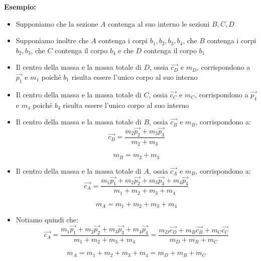 \documentclass[12pt]{report}
\renewcommand\vec{\overrightarrow}
\begin{document}
    \textbf{Esempio:}
    \begin{itemize}
        \item Supponiamo che la sezione $A$ contenga al suo interno le sezioni $B, C, D$
        \item Supponiamo inoltre che $A$ contenga i corpi $b_1, b_2, b_3, b_4$, che $B$ contenga i corpi $b_2, b_3$, che $C$ contenga il corpo $b_4$ e che $D$ contenga il corpo $b_1$ 
        \item Il centro della massa e la massa totale di $D$, ossia $\vec{c_D}$ e $m_D$, corrispondono a $\vec{p_1}$ e $m_1$ poiché $b_1$ risulta essere l'unico corpo al suo interno
        \item Il centro della massa e la massa totale di $C$, ossia $\vec{c_C}$ e $m_C$, corrispondono a $\vec{p_4}$ e $m_4$ poiché $b_4$ risulta essere l'unico corpo al suo interno
        \item Il centro della massa e la massa totale di $B$, ossia $\vec{c_B}$ e $m_B$, corrispondono a: 
        \[\vec{c_B} = \frac{m_2 \vec{p_2} + m_3 \vec{p_3}}{m_2 + m_3}\]

        \[m_B = m_2 + m_3\]

        \item Il centro della massa e la massa totale di $A$, ossia $\vec{c_A}$ e $m_B$, corrispondono a:
        \[\vec{c_A} = \frac{m_1 \vec{p_1} + m_2 \vec{p_2} + m_3 \vec{p_3} + m_4 \vec{p_4}}{m_1 + m_2 + m_3 + m_4}\]

        \[m_A = m_1 + m_2 + m_3 + m_4\]
        \item Notiamo quindi che:
        \[\vec{c_A} = \frac{m_1 \vec{p_1} + m_2 \vec{p_2} + m_3 \vec{p_3} + m_4 \vec{p_4}}{m_1 + m_2 + m_3 + m_4} = \frac{m_D \vec{c_D} + m_B \vec{c_B} + m_C \vec{c_C}}{m_D + m_B + m_C}\]

        \[m_A = m_1 + m_2 + m_3 + m_4 = m_D + m_B + m_C\]
    \end{itemize}
\end{document}

